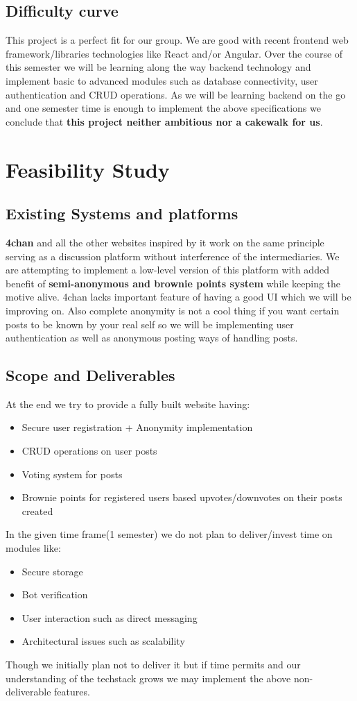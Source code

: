 \documentclass[12pt]{article}
\begin{document}
\subsection{Difficulty curve}
This project is a perfect fit for our group. We are good with recent frontend web framework/libraries technologies like React and/or Angular. Over the course of this semester we will be learning along the way backend technology and implement basic to advanced modules such as database connectivity, user authentication and CRUD operations. As we will be learning backend on the go and one semester time is enough to implement the above specifications we conclude that \textbf{this project neither ambitious nor a cakewalk for us}.

\section{Feasibility Study}

\subsection{Existing Systems and platforms}
\textbf{4chan} and all the other websites inspired by it work on the same principle serving as a discussion platform without interference of the intermediaries. We are attempting to implement a low-level version of this platform with added benefit of \textbf{semi-anonymous and brownie points system} while keeping the motive alive. 4chan lacks important feature of having a good UI which we will be improving on. Also complete anonymity is not a cool thing if you want certain posts to be known by your real self so we will be implementing user authentication as well as anonymous posting ways of handling posts.

\subsection{Scope and Deliverables}
At the end we try to provide a fully built website having:
\begin{itemize}
    \item Secure user registration + Anonymity implementation
    \item CRUD operations on user posts
    \item Voting system for posts
    \item Brownie points for registered users based upvotes/downvotes on their posts created
\end{itemize}
In the given time frame(1 semester) we do not plan to deliver/invest time on modules like: 
\begin{itemize}
    \item Secure storage
    \item Bot verification
    \item User interaction such as direct messaging
    \item Architectural issues such as scalability
\end{itemize}
Though we initially plan not to deliver it but if time permits and our understanding of the techstack grows we may implement the above non-deliverable features.
\end{document}
